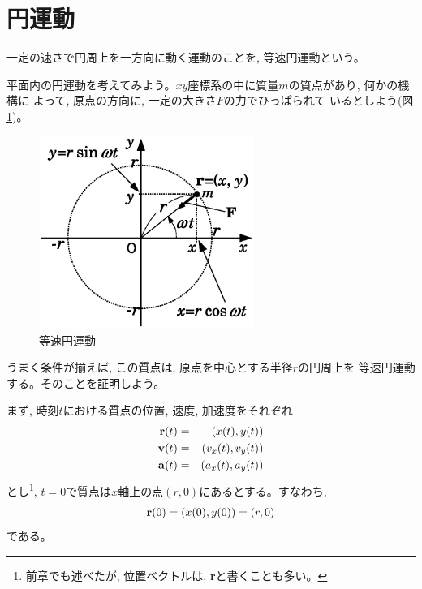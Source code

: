 \section{円運動}

一定の速さで円周上を一方向に動く運動のことを, 等速円運動という。

平面内の円運動を考えてみよう。$xy$座標系の中に質量$m$の質点があり, 何かの機構に
よって, 原点の方向に, 一定の大きさ$F$の力でひっぱられて
いるとしよう(図\ref{fig:circular_motion})。
\begin{figure}[h]
    \centering
    \includegraphics[width=7.0cm]{circular_motion.eps}
    \caption{等速円運動}\label{fig:circular_motion}
\end{figure}
うまく条件が揃えば, この質点は, 原点を中心とする半径$r$の円周上を
等速円運動する。そのことを証明しよう。

まず, 時刻$t$における質点の位置, 速度, 加速度をそれぞれ
\begin{eqnarray}
{\bf r}(t)&=&(x(t), y(t))\\
{\bf v}(t)&=&(v_x(t), v_y(t))\\
{\bf a}(t)&=&(a_x(t), a_y(t))
\end{eqnarray}
とし\footnote{前章でも述べたが, 位置ベクトルは, {\bf r}と書くことも多い。}, 
$t=0$で質点は$x$軸上の点$(r, 0)$にあるとする。すなわち, 
\begin{eqnarray}
{\bf r}(0)=(x(0), y(0))=(r, 0)
\end{eqnarray}
である。

